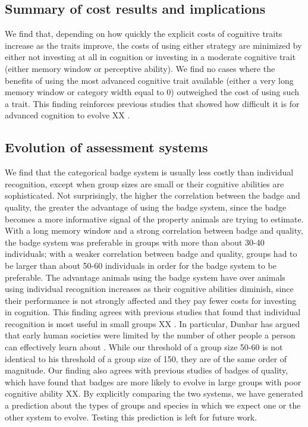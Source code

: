 \subsection*{Summary of cost results and implications} %
We find that, depending on how quickly the explicit costs of cognitive traits increase as the traits improve, the costs of using either strategy are minimized by either not investing at all in cognition or investing in a moderate cognitive trait (either memory window or perceptive ability). We find no cases where the benefits of using the most advanced cognitive trait available (either a very long memory window or category width equal to $0$) outweighed the cost of using such a trait. This finding reinforces previous studies that showed how difficult it is for advanced cognition to evolve XX \cite{Kerr:2003vn}.



\subsection*{Evolution of assessment systems} %

We find that the categorical badge system is usually less costly than individual recognition, except when group sizes are small or their cognitive abilities are sophisticated. Not surprisingly, the higher the correlation between the badge and quality, the greater the advantage of using the badge system, since the badge becomes a more informative signal of the property animals are trying to estimate. With a long memory window and a strong correlation between badge and quality, the badge system was preferable in groups with more than about 30-40 individuals; with a weaker correlation between badge and quality, groups had to be larger than about 50-60 individuals in order for the badge system to be preferable. The advantage animals using the badge system have over animals using individual recognition increases as their cognitive abilities diminish, since their performance is not strongly affected and they pay fewer costs for investing in cognition. This finding agrees with previous studies that found that individual recognition is most useful in small groups XX \cite{Veiga:1993fk}. In particular, Dunbar has argued that early human societies were limited by the number of other people a person can effectively learn about \cite{Dunbar:1993zr,Hill:2003ly}. While our threshold of a group size 50-60 is not identical to his threshold of a group size of 150, they are of the same order of magnitude. Our finding also agrees with previous studies of badges of quality, which have found that badges are more likely to evolve in large groups with poor cognitive ability XX. By explicitly comparing the two systems, we have generated a prediction about the types of groups and species in which we expect one or the other system to evolve. Testing this prediction is left for future work. 


